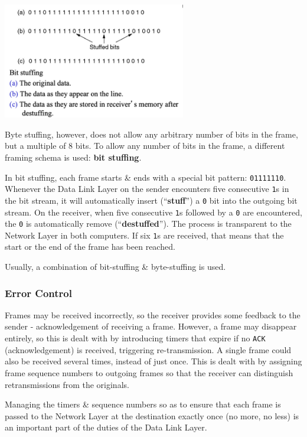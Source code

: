 \documentclass[11pt]{article}
\begin{document}
\begin{center}
    \includegraphics[width=0.6\textwidth]{framing2.png}
\end{center}
Byte stuffing, however, does not allow any arbitrary number of bits in the frame, but a multiple of 8 bits. 
To allow any number of bits in the frame, a different framing schema is used: \textbf{bit stuffing}. 

In bit stuffing, each frame starts \& ends with a special bit pattern: \verb|01111110|. 
Whenever the Data Link Layer on the sender encounters five consecutive \verb|1|s in the bit stream, it will automatically 
insert (``\textbf{stuff}'') a \verb|0| bit into the outgoing bit stream. 
On the receiver, when five consecutive \verb|1|s followed by a \verb|0| are encountered, the \verb|0| is automatically 
remove (``\textbf{destuffed}''). 
The process is transparent to the Network Layer in both computers. 
If six \verb|1|s are received, that means that the start or the end of the frame has been reached. 

Usually, a combination of bit-stuffing \& byte-stuffing is used.

\subsubsection{Error Control}
Frames may be received incorrectly, so the receiver provides some feedback to the sender - acknowledgement of receiving a frame. 
However, a frame may disappear entirely, so this is dealt with by introducing timers that expire if no \verb|ACK| (acknowledgement) 
is received, triggering re-transmission. 
A single frame could also be received several times, instead of just once. 
This is dealt with by assigning frame sequence numbers to outgoing frames so that the receiver can distinguish retransmissions 
from the originals. 

Managing the timers \& sequence numbers so as to ensure that each frame is passed to the Network Layer at the destination 
exactly once (no more, no less) is an important part of the duties of the Data Link Layer.
\end{document}
